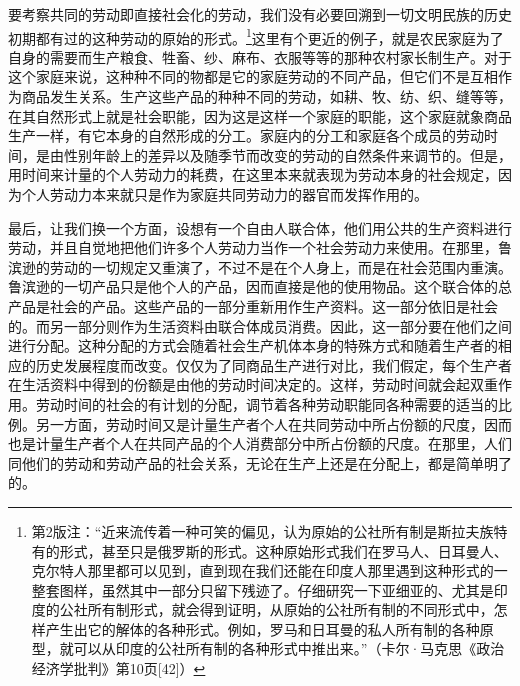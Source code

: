 \documentclass{ctexbook}
\begin{document}
    要考察共同的劳动即直接社会化的劳动，我们没有必要回溯到一切文明民族的历史初期都有过的这种劳动的原始的形式。\footnote{第2版注：“近来流传着一种可笑的偏见，认为原始的公社所有制是斯拉夫族特有的形式，甚至只是俄罗斯的形式。这种原始形式我们在罗马人、日耳曼人、克尔特人那里都可以见到，直到现在我们还能在印度人那里遇到这种形式的一整套图样，虽然其中一部分只留下残迹了。仔细研究一下亚细亚的、尤其是印度的公社所有制形式，就会得到证明，从原始的公社所有制的不同形式中，怎样产生出它的解体的各种形式。例如，罗马和日耳曼的私人所有制的各种原型，就可以从印度的公社所有制的各种形式中推出来。”（卡尔·马克思《政治经济学批判》第10页[42]）}这里有个更近的例子，就是农民家庭为了自身的需要而生产粮食、牲畜、纱、麻布、衣服等等的那种农村家长制生产。对于这个家庭来说，这种种不同的物都是它的家庭劳动的不同产品，但它们不是互相作为商品发生关系。生产这些产品的种种不同的劳动，如耕、牧、纺、织、缝等等，在其自然形式上就是社会职能，因为这是这样一个家庭的职能，这个家庭就象商品生产一样，有它本身的自然形成的分工。家庭内的分工和家庭各个成员的劳动时间，是由性别年龄上的差异以及随季节而改变的劳动的自然条件来调节的。但是，用时间来计量的个人劳动力的耗费，在这里本来就表现为劳动本身的社会规定，因为个人劳动力本来就只是作为家庭共同劳动力的器官而发挥作用的。
    
    最后，让我们换一个方面，设想有一个自由人联合体，他们用公共的生产资料进行劳动，并且自觉地把他们许多个人劳动力当作一个社会劳动力来使用。在那里，鲁滨逊的劳动的一切规定又重演了，不过不是在个人身上，而是在社会范围内重演。鲁滨逊的一切产品只是他个人的产品，因而直接是他的使用物品。这个联合体的总产品是社会的产品。这些产品的一部分重新用作生产资料。这一部分依旧是社会的。而另一部分则作为生活资料由联合体成员消费。因此，这一部分要在他们之间进行分配。这种分配的方式会随着社会生产机体本身的特殊方式和随着生产者的相应的历史发展程度而改变。仅仅为了同商品生产进行对比，我们假定，每个生产者在生活资料中得到的份额是由他的劳动时间决定的。这样，劳动时间就会起双重作用。劳动时间的社会的有计划的分配，调节着各种劳动职能同各种需要的适当的比例。另一方面，劳动时间又是计量生产者个人在共同劳动中所占份额的尺度，因而也是计量生产者个人在共同产品的个人消费部分中所占份额的尺度。在那里，人们同他们的劳动和劳动产品的社会关系，无论在生产上还是在分配上，都是简单明了的。
    
\end{document}
